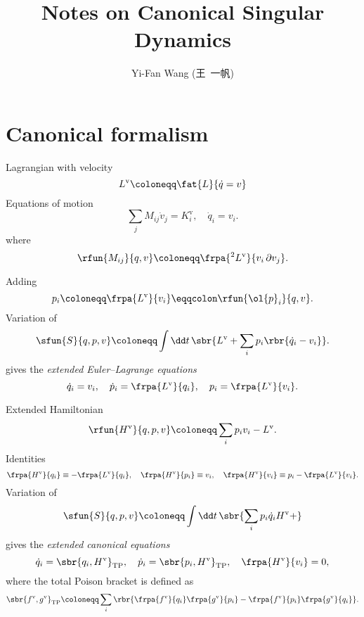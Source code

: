 \documentclass[a4paper,10pt]{article}
\title{Notes on Canonical Singular Dynamics}
\author{Yi-Fan Wang (王\ 一帆)}
\begin{document}
\maketitle

\section{Canonical formalism}

Lagrangian with velocity
\begin{equation}
L^\text{v} \coloneqq \fat{L}{\dot{q} = v}
\end{equation}
Equations of motion
\begin{equation}
\sum_j M_{ij}\dot{v}_j = K^\text{v}_i,\quad
\dot{q}_i = v_i.
\end{equation}
where
\begin{equation}
\rfun{M_{ij}}{q,v} \coloneqq \frpa{^2 L^\text{v}}{v_i\,\partial v_j}.
\end{equation}

Adding
\begin{equation}
p_i \coloneqq \frpa{L^\text{v}}{v_i} \eqqcolon \rfun{\ol{p}_i}{q,v}.
\end{equation}
Variation of
\begin{equation}
\sfun{S}{q, p, v} \coloneqq \int\dd t\,\sbr{L^\text{v} + \sum_i 
p_i\rbr{\dot{q}_i - v_i}}.
\end{equation}
gives the \emph{extended Euler--Lagrange equations}
\begin{equation}
\dot{q}_i = v_i,\quad
\dot{p}_i = \frpa{L^\text{v}}{q_i},\quad
p_i = \frpa{L^\text{v}}{v_i}.
\end{equation}

Extended Hamiltonian
\begin{equation}
\rfun{H^\text{v}}{q, p, v} \coloneqq \sum_i p_i v_i - L^\text{v}.
\end{equation}
Identities
\begin{equation}
\frpa{H^\text{v}}{q_i} \equiv - \frpa{L^\text{v}}{q_i},\quad
\frpa{H^\text{v}}{p_i} \equiv v_i,\quad
\frpa{H^\text{v}}{v_i} \equiv p_i - \frpa{L^\text{v}}{v_i}.
\end{equation}
Variation of
\begin{equation}
\sfun{S}{q, p, v} \coloneqq \int\dd t\,\sbr{\sum_i 
p_i \dot{q}_i H^\text{v} + }
\end{equation}
gives the \emph{extended canonical equations}
\begin{equation}
\dot{q}_i = \sbr{q_i, H^\text{v}}_\text{TP},\quad
\dot{p}_i = \sbr{p_i, H^\text{v}}_\text{TP},\quad
\frpa{H^\text{v}}{v_i} = 0,
\end{equation}
where the total Poison bracket is defined as
\begin{equation}
\sbr{f^\text{v}, g^\text{v}}_\text{TP} \coloneqq 
\sum_i\rbr{\frpa{f^\text{v}}{q_i}\frpa{g^\text{v}}{p_i} -
\frpa{f^\text{v}}{p_i}\frpa{g^\text{v}}{q_i}}.
\end{equation}
\end{document}
